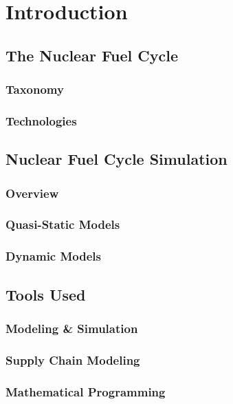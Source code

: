 \chapter{Introduction}\label{ch:intro}

\section{The Nuclear Fuel Cycle}

\subsection{Taxonomy}

\subsection{Technologies}

\section{Nuclear Fuel Cycle Simulation}

\subsection{Overview}

\subsection{Quasi-Static Models}

\subsection{Dynamic Models}

\section{Tools Used}

\subsection{Modeling \& Simulation}

\subsection{Supply Chain Modeling}

\subsection{Mathematical Programming}

